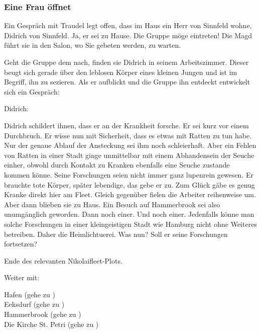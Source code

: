 
\subsubsection{Eine Frau öffnet}
\label{frau öffnet}

Ein Gespräch mit Traudel legt offen, dass im Haus ein Herr von Sinnfeld wohne, Didrich von Sinnfeld. Ja, er sei zu Hause. Die Gruppe möge eintreten! Die Magd führt sie in den Salon, wo Sie gebeten werden, zu warten.


Geht die Gruppe dem nach, finden sie Didrich in seinem Arbeitszimmer. Dieser beugt sich gerade über den leblosen Körper eines kleinen Jungen und ist im Begriff, ihn zu sezieren.
Als er aufblickt und die Gruppe ihn entdeckt entwickelt sich ein Gespräch:

Didrich: 

Didrich schildert ihnen, dass er an der Krankheit forsche. Er sei kurz vor einem Durchbruch. Er wisse nun mit Sicherheit, dass es etwas mit Ratten zu tun habe. Nur der genaue Ablauf der Ansteckung sei ihm noch schleierhaft. Aber ein Fehlen von Ratten in einer Stadt ginge unmittelbar mit einem Abhandensein der Seuche einher, obwohl durch Kontakt zu Kranken ebenfalls eine Seuche zustande kommen könne. Seine Forschungen seien nicht immer ganz lupenrein gewesen. Er brauchte tote Körper, später lebendige, das gebe er zu. Zum Glück gäbe es genug Kranke direkt hier am Fleet. Gleich gegenüber fielen die Arbeiter reihenweise um. Aber dann blieben sie zu Haus. Ein Besuch auf Hammerbrook sei also unumgänglich geworden. Dann noch einer. Und noch einer. Jedenfalls könne man solche Forschungen in einer kleingeistigen Stadt wie Hamburg nicht ohne Weiteres betreiben. Daher die Heimlichtuerei. Was nun? Soll er seine Forschungen fortsetzen?


Ende des relevanten Nikolaifleet-Plots.

Weiter mit:

Hafen (gehe zu \blue{\ref{Hafen}}) \\
Eeksdurf (gehe zu \blue{\ref{xd}}) \\
Hammerbrook (gehe zu \blue{\ref{arm}}) \\
Die Kirche St. Petri (gehe zu \blue{\ref{Petri}}) \\
